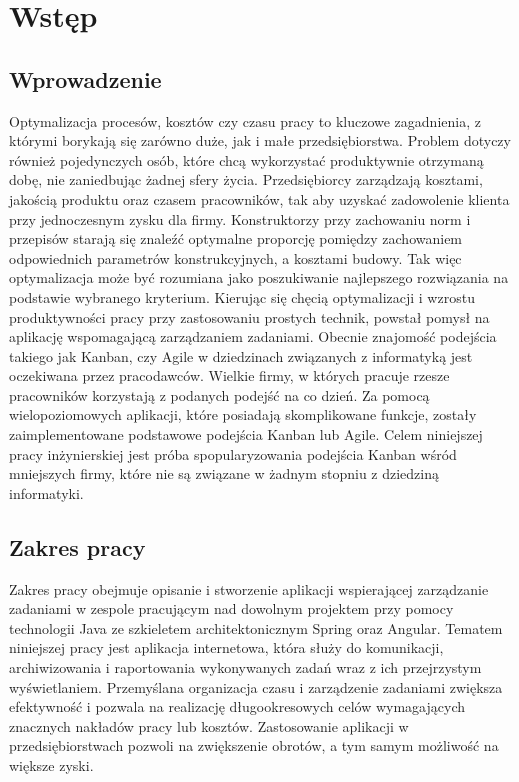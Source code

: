 \chapter{Wstęp}
\thispagestyle{chapterBeginStyle}

\section{Wprowadzenie}
Optymalizacja procesów, kosztów czy czasu pracy to kluczowe zagadnienia, z którymi borykają się zarówno duże, jak i małe przedsiębiorstwa. Problem dotyczy również pojedynczych osób, które chcą wykorzystać produktywnie otrzymaną dobę, nie zaniedbując żadnej sfery życia. Przedsiębiorcy zarządzają kosztami, jakością produktu oraz czasem pracowników, tak aby uzyskać zadowolenie klienta przy jednoczesnym zysku dla firmy. Konstruktorzy przy zachowaniu norm i przepisów starają się znaleźć optymalne proporcję pomiędzy zachowaniem odpowiednich parametrów konstrukcyjnych, a kosztami budowy. Tak więc optymalizacja może być rozumiana jako poszukiwanie najlepszego rozwiązania na podstawie wybranego kryterium. Kierując się chęcią optymalizacji i wzrostu produktywności pracy przy zastosowaniu prostych technik, powstał pomysł na aplikację wspomagającą zarządzaniem zadaniami. Obecnie znajomość podejścia takiego jak Kanban, czy Agile w dziedzinach związanych z informatyką jest oczekiwana przez pracodawców. Wielkie firmy, w których pracuje rzesze pracowników korzystają z podanych podejść na co dzień. Za pomocą wielopoziomowych aplikacji, które posiadają skomplikowane funkcje, zostały zaimplementowane podstawowe podejścia Kanban lub Agile. Celem niniejszej pracy inżynierskiej jest próba spopularyzowania podejścia Kanban wśród mniejszych firmy, które nie są związane w żadnym stopniu z dziedziną informatyki. 
\section{Zakres pracy}
Zakres pracy obejmuje opisanie i stworzenie aplikacji wspierającej zarządzanie zadaniami w zespole pracującym nad dowolnym projektem przy pomocy technologii Java ze szkieletem architektonicznym Spring oraz Angular. Tematem niniejszej pracy jest aplikacja internetowa, która służy do komunikacji, archiwizowania i raportowania wykonywanych zadań wraz z ich przejrzystym wyświetlaniem. Przemyślana organizacja czasu i zarządzenie zadaniami zwiększa efektywność i pozwala na realizację długookresowych celów wymagających znacznych nakładów pracy lub kosztów. Zastosowanie aplikacji w przedsiębiorstwach pozwoli na zwiększenie obrotów, a tym samym możliwość na większe zyski.

